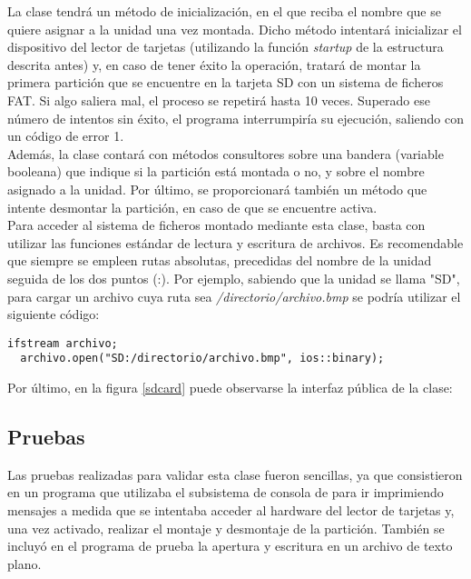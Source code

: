La clase tendrá un método de inicialización, en el que reciba el nombre que se quiere asignar a la unidad una vez montada. Dicho método intentará inicializar el dispositivo del lector de tarjetas (utilizando la función \emph{startup} de la estructura descrita antes) y, en caso de tener éxito la operación, tratará de montar la primera partición que se encuentre en la tarjeta SD con un sistema de ficheros FAT. Si algo saliera mal, el proceso se repetirá hasta 10 veces. Superado ese número de intentos sin éxito, el programa interrumpiría su ejecución, saliendo con un código de error 1.\\

Además, la clase contará con métodos consultores sobre una bandera (variable booleana) que indique si la partición está montada o no, y sobre el nombre asignado a la unidad. Por último, se proporcionará también un método que intente desmontar la partición, en caso de que se encuentre activa.\\

Para acceder al sistema de ficheros montado mediante esta clase, basta con utilizar las funciones estándar de lectura y escritura de archivos. Es recomendable que siempre se empleen rutas absolutas, precedidas del nombre de la unidad seguida de los dos puntos (:). Por ejemplo, sabiendo que la unidad se llama "SD", para cargar un archivo cuya ruta sea \emph{/directorio/archivo.bmp} se podría utilizar el siguiente código:\\

\begin{lstlisting}[style=C++]
  ifstream archivo;
  archivo.open("SD:/directorio/archivo.bmp", ios::binary);
\end{lstlisting}

Por último, en la figura \ref{sdcard} puede observarse la interfaz pública de la clase:\\


\subsection{Pruebas}

Las pruebas realizadas para validar esta clase fueron sencillas, ya que consistieron en un programa que utilizaba  el subsistema de consola de  para ir imprimiendo mensajes a medida que se intentaba acceder al hardware del lector de tarjetas y, una vez activado, realizar el montaje y desmontaje de la partición. También se incluyó en el programa de prueba la apertura y escritura en un archivo de texto plano.

